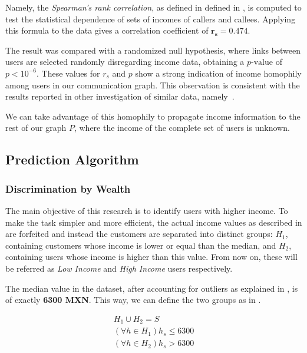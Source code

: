 Namely, the \textit{Spearman's rank correlation}, as defined in defined in , is computed to test the statistical dependence of sets of incomes of callers and callees. Applying this formula to the data gives a correlation coefficient of $\mathbf{r_s = 0.474}$.

The result was compared with a randomized null hypothesis, where links between users are selected randomly disregarding income data, obtaining a $p\text{-value}$ of $p < 10^{-6}$. These values for $r_s$ and $p$ show a strong indication of income homophily among users in our communication graph. This observation is consistent with the results reported in other investigation of similar data, namely~\cite{leo2015socioeconomic}.

We can take advantage of this homophily to propagate income information to the rest of our graph $P$, where the income of the complete set of users is unknown.

\subsection{Prediction Algorithm}
\label{subsec:prediction_algorithm}

\subsubsection{Discrimination by Wealth}
\label{subsec:discrimination_by_wealth}

The main objective of this research is to identify users with higher income. To make the task simpler and more efficient, the actual income values as described in  are forfeited and instead the customers are separated into distinct groups: $H_1$, containing customers whose income is lower or equal than the median, and $H_2$, containing users whose income is higher than this value. From now on, these will be referred as \emph{Low Income} and \emph{High Income} users respectively.

The median value in the dataset, after accounting for outliers as explained in , is of exactly \textbf{6300 MXN}. This way, we can define the two groups as in .

\begin{equation}
\label{eq:h}
\begin{gathered}
H_1 \cup H_2 = S \\
\left( \forall h \in H_1 \right) h_s \leq 6300 \\
\left( \forall h \in H_2 \right) h_s > 6300
\end{gathered}
\end{equation}

